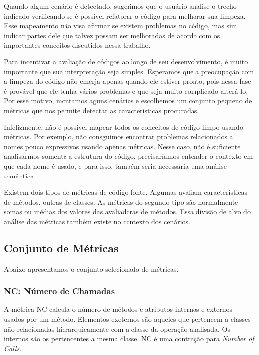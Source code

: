 	
	Quando algum cenário é detectado, sugerimos que o usuário analise o trecho indicado verificando se é possível refatorar o código para melhorar sua limpeza. Esse mapeamento não visa afirmar se existem problemas no código, mas sim indicar partes dele que talvez possam ser melhoradas de acordo com os importantes conceitos discutidos nessa trabalho.

	Para incentivar a avaliação de códigos ao longo de seu desenvolvimento, é muito importante que sua interpretação seja simples. Esperamos que a preocupação com a limpeza do código não emerja apenas quando ele estiver pronto, pois nessa fase é provável que ele tenha vários problemas e que seja muito complicado alterá-lo. Por esse motivo, montamos aguns cenários e escolhemos um conjunto pequeno de métricas que nos permite detectar as características procuradas.
	
	Infelizmente, não é possível mapear todos os conceitos de código limpo usando métricas. Por exemplo, não consguimos encontrar problemas relacionados a nomes pouco expressivos usando apenas métricas. Nesse caso, não é suficiente analisarmos somente a estrutura do código, precisaríamos entender o contexto em que cada nome é usado, e para isso, também seria necessária uma análise semântica.

	Existem dois tipos de métricas de código-fonte. Algumas avaliam características de métodos, outras de classes. As métricas do segundo tipo são normalmente somas ou médias dos valores das avaliadoras de métodos. Essa divisão de alvo do análise das métricas também existe no contexto dos cenários.


\subsection{Conjunto de Métricas}

	Abaixo apresentamos o conjunto selecionado de métricas.

\subsubsection{NC: Número de Chamadas}
                             
	A métrica NC calcula o número de métodos e atributos internos e externos usados por um método. Elementos exeternos são aqueles que pertencem a classes não relacionadas hierarquicamente com a classe da operação analisada. Os internos são os pertencentes a mesma classe. NC é uma contração para \textit{Number of Calls}.

